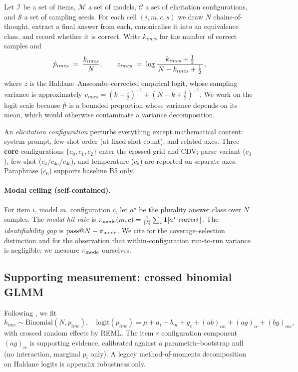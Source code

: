 Let $\mathcal{I}$ be a set of items, $\mathcal{M}$ a set of models,
$\mathcal{C}$ a set of elicitation configurations, and $\mathcal{S}$ a set of
sampling seeds. For each cell $(i,m,c,s)$ we draw $N$ chains-of-thought,
extract a final answer from each, canonicalise it into an equivalence class,
and record whether it is correct. Write $k_{imcs}$ for the number of correct
samples and
\begin{equation}
\hat{p}_{imcs} \;=\; \frac{k_{imcs}}{N},
\qquad
z_{imcs} \;=\; \log\frac{k_{imcs}+\tfrac12}{\,N-k_{imcs}+\tfrac12\,},
\end{equation}
where $z$ is the Haldane--Anscombe-corrected empirical logit, whose sampling
variance is approximately $v_{imcs} = (k+\tfrac12)^{-1} + (N-k+\tfrac12)^{-1}$.
We work on the logit scale because $\hat{p}$ is a bounded proportion whose
variance depends on its mean, which would otherwise contaminate a variance
decomposition.

An \emph{elicitation configuration} perturbs everything except mathematical
content: system prompt, few-shot order (at fixed shot count), and related axes.
Three \textbf{core} configurations $\{c_0,c_1,c_2\}$ enter the crossed
grid and CDV; parse-variant ($c_3$), few-shot ($c_4$/$c_{4a}$/$c_{4b}$), and
temperature ($c_5$) are reported on separate axes. Paraphrase ($c_6$) supports baseline
B5 only.

\paragraph{Modal ceiling (self-contained).} For item $i$, model $m$,
configuration $c$, let $a^\star$ be the plurality answer class over $N$
samples. The \emph{modal-hit rate} is
$\pi_{\mathrm{mode}}(m,c)=\frac{1}{|\mathcal I|}\sum_i \mathbf 1[a^\star\text{ correct}]$.
The \emph{identifiability gap} is $\mathrm{pass@}N-\pi_{\mathrm{mode}}$. We cite
\citet{brown2024monkeys} for the coverage--selection distinction and
\citet{bay2026modal} for the observation that within-configuration run-to-run
variance is negligible; we measure $\pi_{\mathrm{mode}}$ ourselves.

\subsection{Supporting measurement: crossed binomial GLMM}
\label{sec:method-variance}

Following \citet{tee2026,prompteval2024}, we fit
\begin{equation}
k_{imc} \sim \mathrm{Binomial}(N, p_{imc}), \quad
\mathrm{logit}(p_{imc}) = \mu + a_i + b_m + g_c
  + (ab)_{im} + (ag)_{ic} + (bg)_{mc},
\end{equation}
with crossed random effects by REML. The item\,$\times$\,configuration
component $(ag)_{ic}$ is supporting evidence, calibrated against a
parametric-bootstrap null (no interaction, marginal $p_i$ only). A legacy
method-of-moments decomposition on Haldane logits is appendix robustness only.

